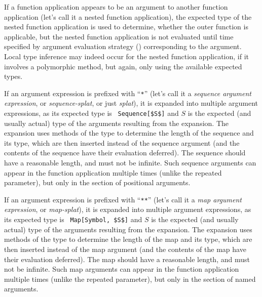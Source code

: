 If a function application appears to be an argument to another function application (let's call it a nested function application), the expected type of the nested function application is used to determine, whether the outer function is applicable, but the nested function application is not evaluated until time specified by argument evaluation strategy () corresponding to the argument. Local type inference may indeed occur for the nested function application, if it involves a polymorphic method, but again, only using the available expected types. 

If an argument expression is prefixed with ``\lstinline!*!'' (let's call it a {\em sequence argument expression}, or {\em sequence-splat}, or just {\em splat}), it is expanded into multiple argument expressions, as its expected type is ~\lstinline!Sequence[$S$]! and $S$ is the expected (and usually actual) type of the arguments resulting from the expansion. The expansion uses methods of the  type to determine the length of the sequence and its type, which are then inserted instead of the sequence argument (and the contents of the sequence have their evaluation deferred). The sequence should have a reasonable length, and must not be infinite. Such sequence arguments can appear in the function application multiple times (unlike the repeated parameter), but only in the section of positional arguments. 

If an argument expression is prefixed with ``\lstinline!**!'' (let's call it a {\em map argument expression}, or {\em map-splat}), it is expanded into multiple argument expressions, as its expected type is ~\lstinline!Map[Symbol, $S$]! and $S$ is the expected (and usually actual) type of the arguments resulting from the expansion. The expansion uses methods of the  type to determine the length of the map and its type, which are then inserted instead of the map argument (and the contents of the map have their evaluation deferred). The map should have a reasonable length, and must not be infinite. Such map arguments can appear in the function application multiple times (unlike the repeated parameter), but only in the section of named arguments. 

